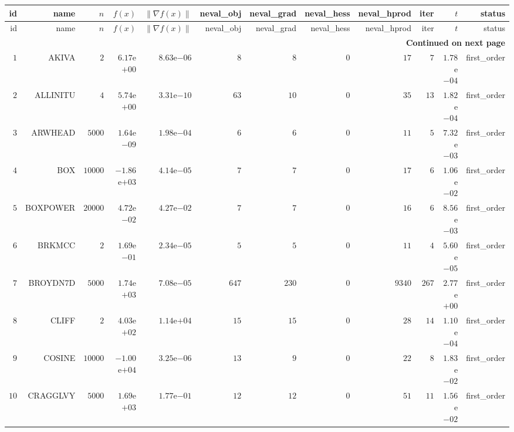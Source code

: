 \begin{longtable}{rrrrrrrrrrrr}
  \hline
  id & name & \(n\) & \(f(x)\) & \(\|\nabla f(x)\|\) & neval\_obj & neval\_grad & neval\_hess & neval\_hprod & iter & \(t\) & status \\\hline
  \endfirsthead
  \hline
  id & name & \(n\) & \(f(x)\) & \(\|\nabla f(x)\|\) & neval\_obj & neval\_grad & neval\_hess & neval\_hprod & iter & \(t\) & status \\\hline
  \endhead
  \hline
  \multicolumn{12}{r}{{\bfseries Continued on next page}}\\
  \hline
  \endfoot
  \endlastfoot
  \(     1\) & AKIVA & \(     2\) & \( 6.17\)e\(+00\) & \( 8.63\)e\(-06\) & \(     8\) & \(     8\) & \(     0\) & \(    17\) & \(     7\) & \( 1.78\)e\(-04\) & first\_order \\
  \(     2\) & ALLINITU & \(     4\) & \( 5.74\)e\(+00\) & \( 3.31\)e\(-10\) & \(    63\) & \(    10\) & \(     0\) & \(    35\) & \(    13\) & \( 1.82\)e\(-04\) & first\_order \\
  \(     3\) & ARWHEAD & \(  5000\) & \( 1.64\)e\(-09\) & \( 1.98\)e\(-04\) & \(     6\) & \(     6\) & \(     0\) & \(    11\) & \(     5\) & \( 7.32\)e\(-03\) & first\_order \\
  \(     4\) & BOX & \( 10000\) & \(-1.86\)e\(+03\) & \( 4.14\)e\(-05\) & \(     7\) & \(     7\) & \(     0\) & \(    17\) & \(     6\) & \( 1.06\)e\(-02\) & first\_order \\
  \(     5\) & BOXPOWER & \( 20000\) & \( 4.72\)e\(-02\) & \( 4.27\)e\(-02\) & \(     7\) & \(     7\) & \(     0\) & \(    16\) & \(     6\) & \( 8.56\)e\(-03\) & first\_order \\
  \(     6\) & BRKMCC & \(     2\) & \( 1.69\)e\(-01\) & \( 2.34\)e\(-05\) & \(     5\) & \(     5\) & \(     0\) & \(    11\) & \(     4\) & \( 5.60\)e\(-05\) & first\_order \\
  \(     7\) & BROYDN7D & \(  5000\) & \( 1.74\)e\(+03\) & \( 7.08\)e\(-05\) & \(   647\) & \(   230\) & \(     0\) & \(  9340\) & \(   267\) & \( 2.77\)e\(+00\) & first\_order \\
  \(     8\) & CLIFF & \(     2\) & \( 4.03\)e\(+02\) & \( 1.14\)e\(+04\) & \(    15\) & \(    15\) & \(     0\) & \(    28\) & \(    14\) & \( 1.10\)e\(-04\) & first\_order \\
  \(     9\) & COSINE & \( 10000\) & \(-1.00\)e\(+04\) & \( 3.25\)e\(-06\) & \(    13\) & \(     9\) & \(     0\) & \(    22\) & \(     8\) & \( 1.83\)e\(-02\) & first\_order \\
  \(    10\) & CRAGGLVY & \(  5000\) & \( 1.69\)e\(+03\) & \( 1.77\)e\(-01\) & \(    12\) & \(    12\) & \(     0\) & \(    51\) & \(    11\) & \( 1.56\)e\(-02\) & first\_order \\

\end{longtable}
